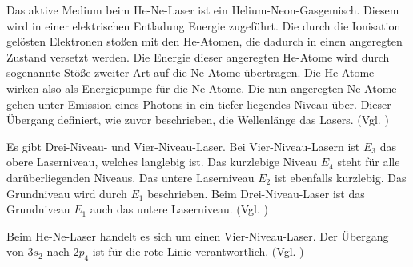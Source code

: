 

Das aktive Medium beim He-Ne-Laser ist ein Helium-Neon-Gasgemisch. Diesem wird in einer elektrischen Entladung Energie zugeführt. Die durch die Ionisation gelösten Elektronen stoßen mit den He-Atomen, die dadurch in einen angeregten Zustand versetzt werden. Die Energie dieser angeregten He-Atome wird durch sogenannte Stöße zweiter Art auf die Ne-Atome übertragen. Die He-Atome wirken also als Energiepumpe für die Ne-Atome. Die nun angeregten Ne-Atome gehen unter Emission eines Photons in ein tiefer liegendes Niveau über. Dieser Übergang definiert, wie zuvor beschrieben, die Wellenlänge das Lasers. (Vgl. \cite{Laser})



Es gibt Drei-Niveau- und Vier-Niveau-Laser.
Bei Vier-Niveau-Lasern ist $E_3$ das obere Laserniveau, welches langlebig ist. Das kurzlebige Niveau $E_4$ steht für alle darüberliegenden Niveaus. Das untere Laserniveau $E_2$ ist ebenfalls kurzlebig. Das Grundniveau wird durch $E_1$ beschrieben.
Beim Drei-Niveau-Laser ist das Grundniveau $E_1$ auch das untere Laserniveau. (Vgl. \cite{Photonik})


Beim He-Ne-Laser handelt es sich um einen Vier-Niveau-Laser.
Der Übergang von $3s_2$ nach $2p_4$ ist für die rote Linie verantwortlich. (Vgl. \cite{Laser})



